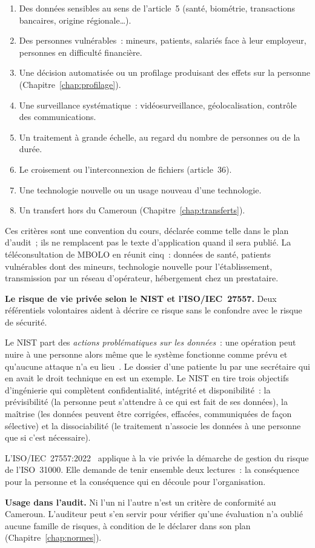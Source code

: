 \begin{enumerate}
    \item Des données sensibles au sens de l'article~5 (santé, biométrie,
          transactions bancaires, origine régionale\ldots).
    \item Des personnes vulnérables~: mineurs, patients, salariés face à
          leur employeur, personnes en difficulté financière.
    \item Une décision automatisée ou un profilage produisant des effets sur
          la personne (Chapitre~\ref{chap:profilage}).
    \item Une surveillance systématique~: vidéosurveillance, géolocalisation,
          contrôle des communications.
    \item Un traitement à grande échelle, au regard du nombre de personnes
          ou de la durée.
    \item Le croisement ou l'interconnexion de fichiers (article~36).
    \item Une technologie nouvelle ou un usage nouveau d'une technologie.
    \item Un transfert hors du Cameroun (Chapitre~\ref{chap:transferts}).
\end{enumerate}

Ces critères sont une convention du cours, déclarée comme telle dans le
plan d'audit~; ils ne remplacent pas le texte d'application quand il sera
publié. La téléconsultation de MBOLO en réunit cinq~: données de santé,
patients vulnérables dont des mineurs, technologie nouvelle pour
l'établissement, transmission par un réseau d'opérateur, hébergement chez
un prestataire.

\begin{boxinfo}
\textbf{Le risque de vie privée selon le NIST et l'ISO/IEC~27557.} Deux
référentiels volontaires aident à décrire ce risque sans le confondre avec
le risque de sécurité.

\smallskip
Le NIST part des \textit{actions problématiques sur les données}~: une
opération peut nuire à une personne alors même que le système fonctionne
comme prévu et qu'aucune attaque n'a eu lieu~\cite{nistir8062}. Le dossier
d'une patiente lu par une secrétaire qui en avait le droit technique en est
un exemple. Le NIST en tire trois objectifs d'ingénierie qui complètent
confidentialité, intégrité et disponibilité~: la prévisibilité (la personne
peut s'attendre à ce qui est fait de ses données), la maîtrise (les données
peuvent être corrigées, effacées, communiquées de façon sélective) et la
dissociabilité (le traitement n'associe les données à une personne que si
c'est nécessaire).

\smallskip
L'ISO/IEC~27557:2022~\cite{iso27557} applique à la vie privée la démarche
de gestion du risque de l'ISO~31000. Elle demande de tenir ensemble deux
lectures~: la conséquence pour la personne et la conséquence qui en
découle pour l'organisation.

\smallskip
\textbf{Usage dans l'audit.} Ni l'un ni l'autre n'est un critère de
conformité au Cameroun. L'auditeur peut s'en servir pour vérifier qu'une
évaluation n'a oublié aucune famille de risques, à condition de le
déclarer dans son plan (Chapitre~\ref{chap:normes}).
\end{boxinfo}

